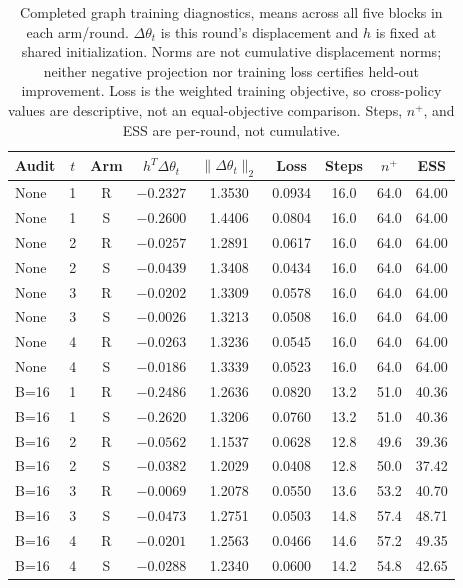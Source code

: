 \begin{table}[H]
\caption{Completed graph training diagnostics, means across all five blocks in each arm/round. $\Delta\theta_t$ is this round's displacement and $h$ is fixed at shared initialization. Norms are not cumulative displacement norms; neither negative projection nor training loss certifies held-out improvement. Loss is the weighted training objective, so cross-policy values are descriptive, not an equal-objective comparison. Steps, $n^+$, and ESS are per-round, not cumulative.}
\label{tab:h100-dynamics}
\centering\small\setlength{\tabcolsep}{4pt}
\begin{tabular}{@{}lcccccccc@{}}
\toprule
Audit & $t$ & Arm & $h^T\Delta\theta_t$ & $\|\Delta\theta_t\|_2$ & Loss & Steps & $n^+$ & ESS\\
\midrule
None & 1 & R & $-0.2327$ & 1.3530 & 0.0934 & 16.0 & 64.0 & 64.00\\
None & 1 & S & $-0.2600$ & 1.4406 & 0.0804 & 16.0 & 64.0 & 64.00\\
None & 2 & R & $-0.0257$ & 1.2891 & 0.0617 & 16.0 & 64.0 & 64.00\\
None & 2 & S & $-0.0439$ & 1.3408 & 0.0434 & 16.0 & 64.0 & 64.00\\
None & 3 & R & $-0.0202$ & 1.3309 & 0.0578 & 16.0 & 64.0 & 64.00\\
None & 3 & S & $-0.0026$ & 1.3213 & 0.0508 & 16.0 & 64.0 & 64.00\\
None & 4 & R & $-0.0263$ & 1.3236 & 0.0545 & 16.0 & 64.0 & 64.00\\
None & 4 & S & $-0.0186$ & 1.3339 & 0.0523 & 16.0 & 64.0 & 64.00\\
B=16 & 1 & R & $-0.2486$ & 1.2636 & 0.0820 & 13.2 & 51.0 & 40.36\\
B=16 & 1 & S & $-0.2620$ & 1.3206 & 0.0760 & 13.2 & 51.0 & 40.36\\
B=16 & 2 & R & $-0.0562$ & 1.1537 & 0.0628 & 12.8 & 49.6 & 39.36\\
B=16 & 2 & S & $-0.0382$ & 1.2029 & 0.0408 & 12.8 & 50.0 & 37.42\\
B=16 & 3 & R & $-0.0069$ & 1.2078 & 0.0550 & 13.6 & 53.2 & 40.70\\
B=16 & 3 & S & $-0.0473$ & 1.2751 & 0.0503 & 14.8 & 57.4 & 48.71\\
B=16 & 4 & R & $-0.0201$ & 1.2563 & 0.0466 & 14.6 & 57.2 & 49.35\\
B=16 & 4 & S & $-0.0288$ & 1.2340 & 0.0600 & 14.2 & 54.8 & 42.65\\
\bottomrule
\end{tabular}
\end{table}
